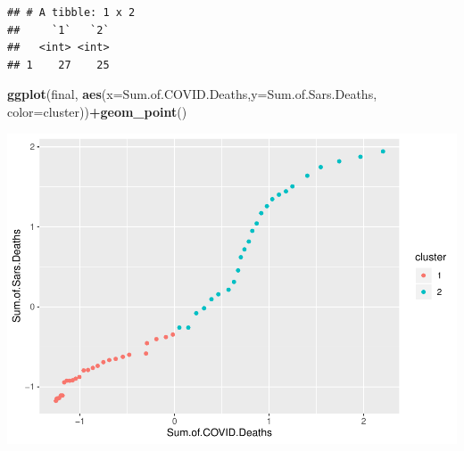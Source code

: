 \documentclass[
]{article}
\newenvironment{Shaded}{\begin{snugshade}}{\end{snugshade}}
\newcommand{\DataTypeTok}[1]{\textcolor[rgb]{0.13,0.29,0.53}{#1}}
\newcommand{\DecValTok}[1]{\textcolor[rgb]{0.00,0.00,0.81}{#1}}
\newcommand{\KeywordTok}[1]{\textcolor[rgb]{0.13,0.29,0.53}{\textbf{#1}}}
\newcommand{\NormalTok}[1]{#1}
\newcommand{\OperatorTok}[1]{\textcolor[rgb]{0.81,0.36,0.00}{\textbf{#1}}}
\newcommand{\StringTok}[1]{\textcolor[rgb]{0.31,0.60,0.02}{#1}}
\begin{document}
\begin{Shaded}
\end{Shaded}

\begin{verbatim}
## # A tibble: 1 x 2
##     `1`   `2`
##   <int> <int>
## 1    27    25
\end{verbatim}

\begin{Shaded}
\begin{Highlighting}[]
\KeywordTok{ggplot}\NormalTok{(final, }\KeywordTok{aes}\NormalTok{(}\DataTypeTok{x=}\NormalTok{Sum.of.COVID.Deaths,}\DataTypeTok{y=}\NormalTok{Sum.of.Sars.Deaths, }\DataTypeTok{color=}\NormalTok{cluster))}\OperatorTok{+}\KeywordTok{geom_point}\NormalTok{()}
\end{Highlighting}
\end{Shaded}

\begin{center}\includegraphics{project1_files/figure-latex/unnamed-chunk-5-2} \end{center}
\end{document}
